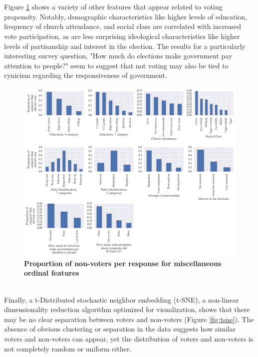 \documentclass{article}
\begin{document}
	\hfill \\\\
	Figure \ref{fig:ordinal_other} shows a variety of other features that appear related to voting propensity. Notably, demographic characteristics like higher levels of education, frequency of church attendance, and social class are correlated with increased vote participation, as are less surprising ideological characteristics like higher levels of partisanship and interest in the election. The results for a particularly interesting survey question, "How much do elections make government pay attention to people?" seem to suggest that not voting may also be tied to cynicism regarding the responsiveness of government.
	\newpage
	\begin{figure}[h!]
		\begin{center}
			\includegraphics*[width=1\linewidth]{ordinal_other}
			\caption{\textbf{Proportion of non-voters per response for miscellaneous ordinal features}}
			\label{fig:ordinal_other}
		\end{center}
	\end{figure}
	\hfill \\
	Finally, a t-Distributed stochastic neighbor embedding (t-SNE), a non-linear dimensionality reduction algorithm optimized for visualization, shows that there may be no clear separation between voters and non-voters (Figure \ref{fig:tsne}). The absence of obvious clustering or separation in the data suggests how similar voters and non-voters can appear, yet the distribution of voters and non-voters is not completely random or uniform either.
	
\end{document}

